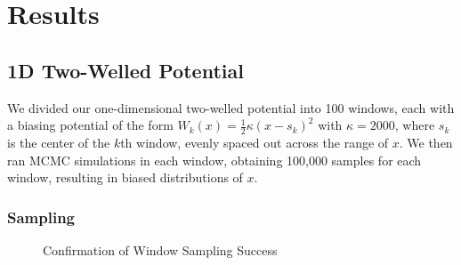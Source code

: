 \documentclass{article}
\begin{document}

\section{Results}

\subsection{1D Two-Welled Potential}

We divided our one-dimensional two-welled potential into 100 windows, each with a biasing potential of the form $W_k(x) = \frac{1}{2} \kappa (x - s_k)^2$ with $\kappa = 2000$, where $s_k$ is the center of the $k$th window, evenly spaced out across the range of $x$. We then ran MCMC simulations in each window, obtaining 100,000 samples for each window, resulting in biased distributions of $x$.

\subsubsection{Sampling}

\begin{figure}[h]%
    \centering
    \qquad
    \caption{Confirmation of Window Sampling Success}%
    \label{fig:converge_diag}%
\end{figure}
\end{document}
